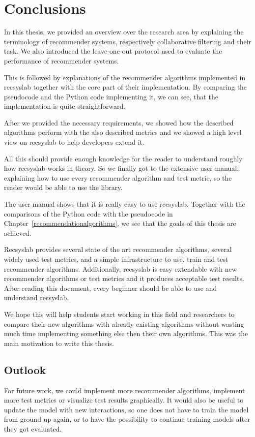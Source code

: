
\chapter{Conclusions}
\label{conclusions}
In this thesis, we provided an overview over the research area by
explaining the terminology of recommender systems, respectively
collaborative filtering and their task. We also introduced the leave-one-out
protocol used to evaluate the performance of recommender systems.

This is followed by explanations of the recommender algorithms implemented in recsyslab
together with the core part of their implementation. By comparing the pseudocode
and the Python code implementing it, we can see, that the implementation is quite
straightforward.

After we provided the necessary requirements, we showed how the described algorithms
perform with the also described metrics and we showed a high level view on 
recsyslab to help developers extend it.

All this should provide enough knowledge for
the reader to understand roughly how recsyslab works in theory.
So we finally got to the extensive user manual,
explaining how to use every recommender algorithm and test metric, so the reader
would be able to use the library.

The user manual shows that it is really easy to use recsyslab.
Together with the comparisons of the Python code with the pseudocode
in Chapter~\ref{recommendationalgorithms}, we see that the goals of
this thesis are achieved.

Recsyslab provides several state of the art recommender algorithms,
several widely used test metrics, and a simple infrastructure to use, train and test
recommender algorithms. Additionally, recsyslab is easy extendable with new 
recommender algorithms or test metrics and it produces acceptable test results.
After reading this document, every beginner should be able to use and understand recsyslab.

We hope this will help students start working in this field and researchers to compare their new algorithms
with already existing algorithms without wasting much time implementing something else
then their own algorithms. This was the main motivation to write this thesis.


\section{Outlook}
For future work, we could implement more recommender algorithms,
implement more test metrics or visualize test results graphically.
It would also be useful to update the model with new interactions, so 
one does not have to train the model from ground up again, or to have the 
possibility to continue training models after they got evaluated.


